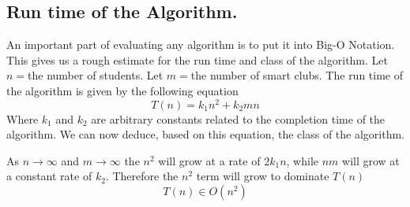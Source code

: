 \documentclass{article}
\begin{document}
\subsection{Run time of the Algorithm.}
An important part of evaluating any algorithm is to put it into Big-O Notation. This gives us a rough estimate for the run time and class of 
the algorithm. Let $n = $the number of students. Let $m = $the number of smart clubs. The run time of the algorithm is given by the following equation 
\begin{equation}
T(n) = k_1n^2 + k_2mn
\end{equation}
Where $k_1$ and $k_2$ are arbitrary constants related to the completion time of the algorithm. We can now deduce, based on this equation, the 
class of the algorithm. 

As $n \to \infty$ and $m \to \infty$ the $n^2$ will grow at a rate of $2k_1n$, while $nm$ will grow at a constant rate of $k_2$. Therefore the
$n^2$ term will grow to dominate $T(n)$
\begin{equation}
T(n) \in O(n^2)
\end{equation}
\end{document}
